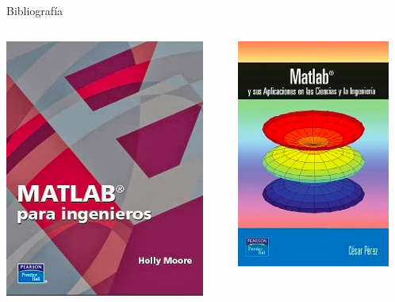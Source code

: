 \documentclass{bredelebeamer}
\begin{document}
\begin{frame}{Bibliografía}
\begin{columns}
\begin{column}{0.5\textwidth}
\begin{center}
\includegraphics[scale=0.4]{images/biblio1.png}
\end{center}
\end{column}
\begin{column}{0.5\textwidth}
\begin{center}
\includegraphics[scale=0.5]{images/biblio2.png}
\end{center}
\end{column}
\end{columns}
\end{frame}
\end{document}
